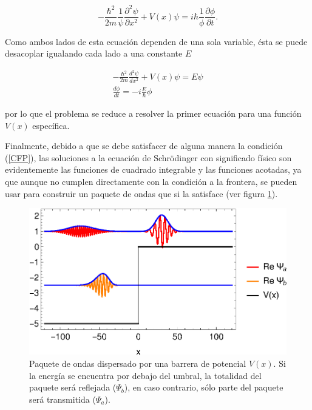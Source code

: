 \begin{equation*}
-\frac{\hbar^2}{2m}  \frac{1}{\psi}\frac{\partial^2 \psi}{\partial x^2}+ V(x) \psi= i\hbar \frac{1}{\phi}\frac{\partial \phi}{\partial t}.
\end{equation*}

Como ambos lados de esta ecuación dependen de una sola variable, ésta se puede desacoplar igualando cada lado a una constante $E$

\begin{eqnarray*}
	-\frac{\hbar^2}{2m}  \frac{d^2 \psi}{d x^2}+ V(x) \psi = E \psi
	\\
	 \frac{d \phi}{dt} = -i \frac{E}{\hbar} \phi
\end{eqnarray*}

por lo que el problema se reduce a resolver la primer ecuación para una función $V(x)$ específica. 

Finalmente, debido a que se debe satisfacer de alguna manera la condición (\ref{CFP}), las soluciones a la ecuación de Schrödinger con significado físico son evidentemente las funciones de cuadrado integrable y las funciones acotadas, ya que aunque no cumplen directamente con la condición a la frontera, se pueden usar para construir un paquete de ondas que si la satisface (ver figura \ref{WP-Figure}).  
\begin{figure}
	\begin{center}
		\includegraphics{WP.eps}%
	\end{center}	
	\caption{\label{WP-Figure} Paquete de ondas dispersado por una barrera de potencial $V(x)$. Si la energía se encuentra por debajo del umbral, la totalidad del paquete será reflejada ($\Psi_b$), en caso contrario, sólo parte del paquete será transmitida ($\Psi_a$).}
\end{figure}

